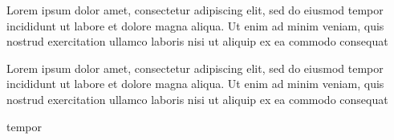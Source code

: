 \documentclass[a4paper, 12pt, twoside, draft]{article}
\begin{document}

\begin{pairs}

\begin{Leftside}
\beginnumbering
\pstart

Lorem ipsum dolor  amet, consectetur adipiscing elit, sed do eiusmod tempor incididunt ut labore et dolore magna aliqua. Ut enim ad minim veniam, quis nostrud exercitation ullamco laboris nisi ut aliquip ex ea commodo consequat

\pend
\endnumbering
\end{Leftside}

\begin{Rightside}
\beginnumbering
\pstart

Lorem ipsum dolor  amet, consectetur adipiscing elit, sed do eiusmod tempor incididunt ut labore et dolore magna aliqua. Ut enim ad minim veniam, quis nostrud exercitation ullamco laboris nisi ut aliquip ex ea commodo consequat

\pend
\endnumbering
\end{Rightside}
\end{pairs}

\Columns


 tempor %

\end{document}
